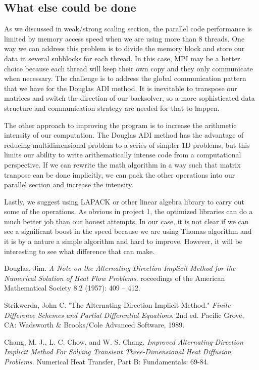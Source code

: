 \documentclass[a4paper,11pt]{article}
\begin{document}
\begin{multicols}{2}
	\subsection{What else could be done}
	As we discussed in weak/strong scaling section, the parallel code performance is limited by memory access speed when we are using more than $8$ threads. One way we can address this problem is to divide the memory block and store our data in several subblocks for each thread. In this case, MPI may be a better choice because each thread will keep their own copy and they only communicate when necessary. The challenge is to address the global communication pattern that we have for the Douglas ADI method. It is inevitable to transpose our matrices and switch the direction of our backsolver, so a more sophisticated data structure and communication strategy are needed for that to happen.
	\par The other approach to improving the program is to increase the arithmetic intensity of our computation. The Douglas ADI method has the advantage of reducing multidimensional problem to a series of simpler 1D problems, but this limits our ability to write arithematically intense code from a computational perspective. If we can rewrite the math algorithm in a way such that matrix tranpose can be done implicitly, we can pack the other operations into our parallel section and increase the intensity.
	\par Lastly, we suggest using LAPACK or other linear algebra library to carry out some of the operations. As obvious in project 1, the optimized libraries can do a much better job than our honest attempts. In our case, it is not clear if we can see a significant boost in the speed because we are using Thomas algorithm and it is by a nature a simple algorithm and hard to improve. However, it will be interesting to see what difference that can make.
\end{multicols}

\newpage
\begin{thebibliography}{9}
 Douglas, Jim. 
\textit{A Note on the Alternating Direction Implicit Method for the Numerical Solution of Heat Flow Problems}. 
roceedings of the American Mathematical Society 8.2 (1957): 409 -- 412. 

 Strikwerda, John C. 
 "The Alternating Direction Implicit Method."
\textit{Finite Difference Schemes and Partial Differential Equations}. 2nd ed. Pacific Grove, CA: Wadsworth \& Brooks/Cole Advanced Software, 1989.
 
Chang, M. J., L. C. Chow, and W. S. Chang. 
\textit{Improved Alternating-Direction Implicit Method For Solving Transient Three-Dimensional Heat Diffusion Problems.} Numerical Heat Transfer, Part B: Fundamentals: 69-84.
\end{thebibliography}
\end{document}
